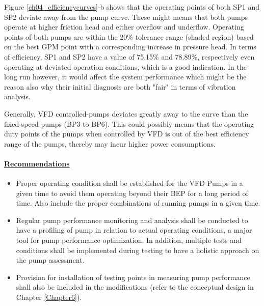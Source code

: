 Figure \ref{ch04_efficiencycurves}-b shows that the operating points of both SP1 and SP2 deviate away from the pump curve. These might means that both pumps  
operate at higher friction head and either overflow and underflow. Operating points of both pumps are within the 20\% tolerance range (shaded region) 
based on the best GPM point with a corresponding increase in pressure head. In terms of efficiency, SP1 and SP2  have a value of 75.15\% and 78.89\%, respectively even 
operating at deviated operation conditions, which is a good indication. In the long run however, it would affect the system performance which might be 
the reason also why their initial diagnosis are both "fair" in terms of vibration analysis.

Generally, VFD controlled-pumps deviates greatly away to the curve than the fixed-speed pumps (BP3 to BP6). This could possibly means that the operating duty points 
of the pumps when controlled by VFD is out of the best efficiency range of the pumps, thereby may incur higher power consumptions. 


\paragraph{\underline{Recommendations}}


\begin{itemize}

\item	Proper operating condition shall be established for the VFD Pumps in a given time to avoid them operating beyond their BEP for a long period of time. 
Also include the proper combinations of running pumps in a given time.

\item	Regular pump performance monitoring and analysis shall be conducted to have a profiling of pump in relation to actual operating conditions, a major tool for pump performance
 optimization. In addition, multiple tests and conditions shall be implemented during testing to have a holistic approach on the pump assessment.

\item	Provision for installation of testing points in measuring pump performance shall also be included in the modifications  (refer to the conceptual design in Chapter \ref{Chapter6}).

\end{itemize}




